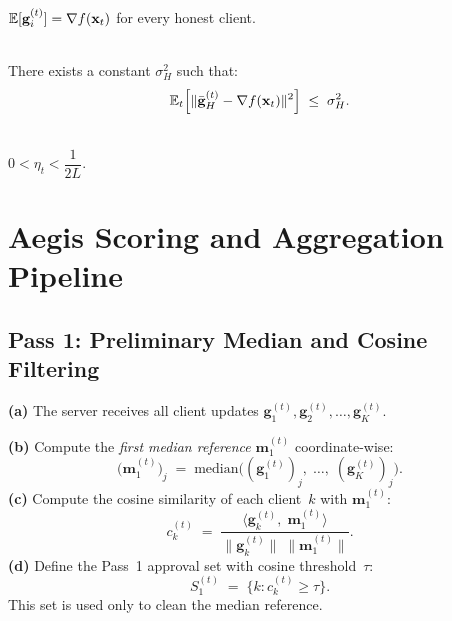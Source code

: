 \documentclass[../main]{subfiles}
\begin{document}
\begin{assumption}
\hfill \\\label{asm:A10}
$\mathbb{E}[\mathbf{g}_i^{(t)}] = \nabla f(\mathbf{x}_t)$ for every honest client.
\end{assumption}

\begin{assumption}
\hfill \\\label{asm:A11}
There exists a constant $\sigma_H^2$ such that:
\[
    \mathbb{E}_t\!\left[\|\bar{\mathbf{g}}_H^{(t)} - \nabla f(\mathbf{x}_t)\|^2\right] \;\leq\; \sigma_H^2.
\]
\end{assumption}

\begin{assumption}
\hfill \\\label{asm:A12}
$0 < \eta_t < \dfrac{1}{2L}$.
\end{assumption}

\section{Aegis Scoring and Aggregation Pipeline}
\label{app:scoring}

\subsection{Pass 1: Preliminary Median and Cosine Filtering}

\textbf{(a)} The server receives all client updates $\mathbf{g}_1^{(t)}, \mathbf{g}_2^{(t)}, \ldots, \mathbf{g}_K^{(t)}$.

\textbf{(b)} Compute the \emph{first median reference} $\mathbf{m}_1^{(t)}$ coordinate-wise:
\begin{equation}
    \bigl(\mathbf{m}_1^{(t)}\bigr)_j \;=\; \mathrm{median}\bigl((\mathbf{g}_1^{(t)})_j,\; \ldots,\; (\mathbf{g}_K^{(t)})_j\bigr).
    \label{eq:first_median}
\end{equation}
\textbf{(c)} Compute the cosine similarity of each client~$k$ with $\mathbf{m}_1^{(t)}$:
\begin{equation}
    c_k^{(t)} \;=\; \frac{\langle \mathbf{g}_k^{(t)},\; \mathbf{m}_1^{(t)}\rangle}
    {\|\mathbf{g}_k^{(t)}\|\;\|\mathbf{m}_1^{(t)}\|}.
    \label{eq:cosine_sim}
\end{equation}
\textbf{(d)} Define the Pass~1 approval set with cosine threshold~$\tau$:
\begin{equation}
    S_1^{(t)} \;=\; \{k : c_k^{(t)} \geq \tau\}.
    \label{eq:pass1_set}
\end{equation}
This set is used only to clean the median reference.
\end{document}
